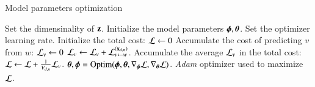 \begin{algorithm} %
\caption{Model parameters optimization} %
\label{alg:optim} %
\begin{algorithmic} %
	\Require Set the dimensinality of $\mathbf{z}$. Initialize the model parameters $\boldsymbol{\phi}, \boldsymbol{\theta}$. Set the optimizer learning rate.
		\State Initialize the total cost:
		\State $\mathcal{L} \leftarrow 0$
					\State Accumulate the cost of predicting $v$ from $w$:
					\State $\mathcal{L}_v \leftarrow 0$
						\State $\mathcal{L}_v \leftarrow \mathcal{L}_v + \mathcal{L}_{v \leftarrow w}^{(\mathbf{x}_{d,n})}$.
					\EndFor
					\State Accumulate the average $\mathcal{L}_v$ in the total cost:
					\State $\mathcal{L} \leftarrow \mathcal{L} + \frac{1}{V_{d,n}} \mathcal{L}_v$.
				\EndFor
			\EndFor
		\EndFor
		\State $\boldsymbol{\theta}, \boldsymbol{\phi} = \operatorname{Optim}(\boldsymbol{\phi}, \boldsymbol{\theta}, \nabla_{\boldsymbol{\phi}} \mathcal{L}, \nabla_{\boldsymbol{\theta}} \mathcal{L})$. \textit{Adam} optimizer used to maximize $\mathcal{L}$.
	\EndWhile
\end{algorithmic}
\end{algorithm}
